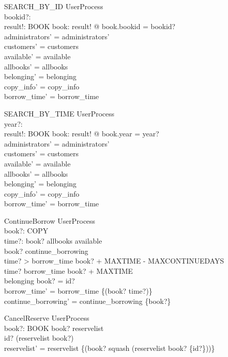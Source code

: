 \begin{schema}{SEARCH\_BY\_ID}
  UserProcess\\
  bookid?: \nat \\
  result!: \power  BOOK
\where
  \forall  book: result! @ book.bookid = bookid?\\
  administrators' = administrators'\\
  customers' = customers\\
  available' = available\\
  allbooks' = allbooks\\
  belonging' = belonging\\
  copy\_info' = copy\_info\\
  borrow\_time' = borrow\_time
\end{schema}

\begin{schema}{SEARCH\_BY\_TIME}
  UserProcess\\
  year?: \nat \\
  result!: \power  BOOK
\where
  \forall  book: result! @ book.year = year?\\
  administrators' = administrators'\\
  customers' = customers\\
  available' = available\\
  allbooks' = allbooks\\
  belonging' = belonging\\
  copy\_info' = copy\_info\\
  borrow\_time' = borrow\_time
\end{schema}

\begin{schema}{ContinueBorrow}
  UserProcess\\
  book?: COPY\\
  time?: \nat 
\where
  book? \in  allbooks \setminus  available\\
  book? \notin  continue\_borrowing\\
  time? > borrow\_time book? + MAXTIME - MAXCONTINUEDAYS\\
  time? \leq  borrow\_time book? + MAXTIME\\
  belonging book? = id?\\
  borrow\_time' = borrow\_time \oplus  \{(book? \mapsto  time?)\}\\
  continue\_borrowing' = continue\_borrowing \cup  \{book?\}
\end{schema}

\begin{schema}{CancelReserve}
  UserProcess\\
  book?: BOOK
\where
  book? \in  \dom  reservelist\\
  id? \in  \ran  (reservelist book?)\\
  reservelist' = reservelist \oplus  \{(book? \mapsto  squash (reservelist book? \nrres  \{id?\}))\}
\end{schema}

